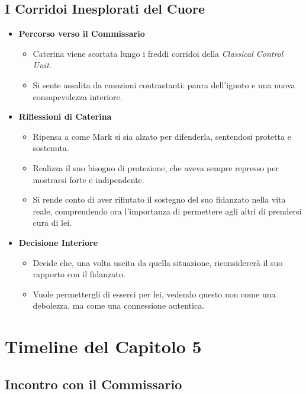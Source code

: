 \subsection*{I Corridoi Inesplorati del Cuore}

\begin{itemize}
    \item \textbf{Percorso verso il Commissario}
    \begin{itemize}
        \item Caterina viene scortata lungo i freddi corridoi della \emph{Classical Control Unit}.
        \item Si sente assalita da emozioni contrastanti: paura dell'ignoto e una nuova consapevolezza interiore.
    \end{itemize}

    \item \textbf{Riflessioni di Caterina}
    \begin{itemize}
        \item Ripensa a come Mark si sia alzato per difenderla, sentendosi protetta e sostenuta.
        \item Realizza il suo bisogno di protezione, che aveva sempre represso per mostrarsi forte e indipendente.
        \item Si rende conto di aver rifiutato il sostegno del suo fidanzato nella vita reale, comprendendo ora l'importanza di permettere agli altri di prendersi cura di lei.
    \end{itemize}

    \item \textbf{Decisione Interiore}
    \begin{itemize}
        \item Decide che, una volta uscita da quella situazione, riconsidererà il suo rapporto con il fidanzato.
        \item Vuole permettergli di esserci per lei, vedendo questo non come una debolezza, ma come una connessione autentica.
    \end{itemize}
\end{itemize}

\section*{Timeline del Capitolo 5}

\subsection*{Incontro con il Commissario}

